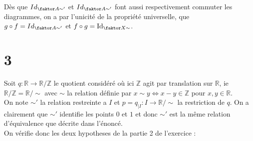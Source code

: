\documentclass[11pt, a4paper]{article}
\DeclareMathOperator{\id}{Id}
\begin{document}
Dès que \(Id_{\faktor A { \sim '}}\) et \(Id_{\faktor A { \sim '}}\) font aussi respectivement commuter les diagrammes, on a par l'unicité de la propriété universelle, que \(g\circ f = Id_{\faktor A { \sim '}}\) et \(f\circ g = \id_{ \faktor X \sim}\). 

\section*{3}
Soit \(q:\mathbb{R}\to\mathbb{R}/\mathbb{Z}\) le quotient considéré où ici \(\mathbb{Z}\) agit par translation sur \(\mathbb{R}\), ie \(\mathbb{R}/\mathbb{Z} = \mathbb{R}/\sim\) avec \(\sim\) la relation définie par \(x\sim y \iff x-y\in\mathbb{Z}\) pour \(x,y\in\mathbb{R}\). \\
On note $\sim '$ la relation restreinte a $I$ et \(p=q_{|I}:I\to \mathbb{R}/\sim\) la restriction de \(q\). On a clairement que $\sim '$ identifie les points $0$ et $1$ et donc $\sim '$ est la même relation d'équivalence que décrite dans l'énoncé. \\
On vérifie donc les deux hypotheses de la partie 2 de l'exercice :
\end{document}
